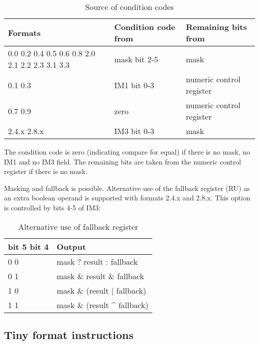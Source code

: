 \documentclass[forwardcom.tex]{subfiles}
\begin{document}
\begin{longtable} {|p{25mm}|p{50mm}|p{50mm}|}
\caption{Source of condition codes} 
\label{table:SourceOfConditionCodes} \\
\endfirsthead
\endhead
\hline
\bfseries Formats & \bfseries Condition code from & \bfseries Remaining bits from \\
\hline
0.0 0.2 0.4 0.5 0.6 0.8 2.0 2.1 2.2 2.3 3.1 3.3 & mask bit 2-5 & mask \\
\hline
0.1 0.3     & IM1 bit 0-3 & numeric control register \\
\hline
0.7 0.9        & zero & numeric control register \\
\hline
2.4.x 2.8.x       & IM3 bit 0-3 & mask  \\
\hline
\end{longtable}

The condition code is zero (indicating compare for equal) if there is no mask, no IM1 and no IM3 field. The remaining bits are taken from the numeric control register if there is no mask.

\vspace{2mm}
Masking and fallback is possible. Alternative use of the fallback register (RU) as an extra boolean operand is supported with formats 2.4.x and 2.8.x. This option is controlled by bits 4-5 of IM3:

\begin{longtable} {|p{25mm}|p{100mm}|}
\caption{Alternative use of fallback register} 
\label{table:AlternativeFallbackForCompare} \\
\endfirsthead
\endhead
\hline
\bfseries bit 5 bit 4 & \bfseries Output \\
\hline
\hspace{5mm} 0 0 & mask ? result : fallback \\
\hline
\hspace{5mm} 0 1 & mask \& result \& fallback \\
\hline
\hspace{5mm} 1 0 & mask \& (result $|$ fallback) \\
\hline
\hspace{5mm} 1 1 & mask \& (result \^{} fallback) \\
\hline
\end{longtable}
\vspace{2mm}


\subsection{Tiny format instructions}
\end{document}
